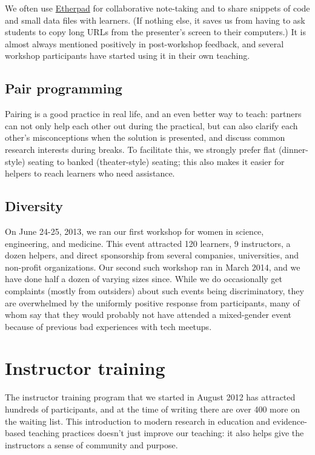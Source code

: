 \documentclass[10pt,a4paper,twocolumn]{article}
\begin{document}
We often use \href{http://etherpad.org}{Etherpad} for collaborative
note-taking and to share snippets of code and small data files with
learners. (If nothing else, it saves us from having to ask students to
copy long URLs from the presenter's screen to their computers.) It is
almost always mentioned positively in post-workshop feedback, and
several workshop participants have started using it in their own
teaching.

\subsection{Pair programming}

Pairing is a good practice in real life, and an even better way to
teach: partners can not only help each other out during the practical,
but can also clarify each other's misconceptions when the solution is
presented, and discuss common research interests during breaks. To
facilitate this, we strongly prefer flat (dinner-style) seating to
banked (theater-style) seating; this also makes it easier for helpers
to reach learners who need assistance.

\subsection{Diversity}

On June 24-25, 2013, we ran our first workshop for women in science,
engineering, and medicine. This event attracted 120 learners, 9
instructors, a dozen helpers, and direct sponsorship from several
companies, universities, and non-profit organizations. Our second such
workshop ran in March 2014, and we have done half a dozen of varying
sizes since.  While we do occasionally get complaints (mostly from
outsiders) about such events being discriminatory, they are
overwhelmed by the uniformly positive response from participants, many
of whom say that they would probably not have attended a mixed-gender
event because of previous bad experiences with tech meetups.

\section{Instructor training}\label{s:instructor-training}

The instructor training program that we started in August 2012 has
attracted hundreds of participants, and at the time of writing there
are over 400 more on the waiting list.  This introduction to modern
research in education and evidence-based teaching practices
\cite{hlw2010} doesn't just improve our teaching: it also helps give
the instructors a sense of community and purpose.
\end{document}
